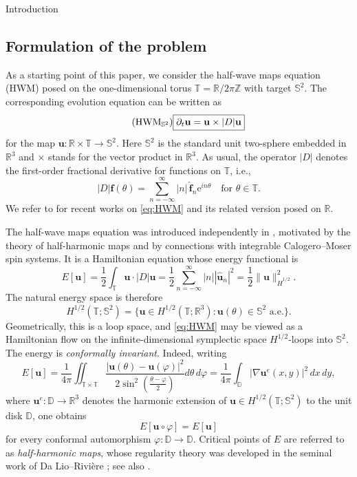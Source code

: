 \documentclass[10pt,reqno,a4paper]{amsart}
\makeatletter
\theoremstyle{definition}
\theoremstyle{remark}
\theoremstyle{remark}
\numberwithin{equation}{section}
\newcommand{\Z}{\mathbb{Z}}
\newcommand{\R}{\mathbb{R}}
\newcommand{\T}{\mathbb{T}}
\newcommand{\D}{\mathbb{D}}
\newcommand{\Ss}{\mathbb{S}}
\newcommand{\pt}{\partial}
\newcommand{\be}{\begin{equation}}
\newcommand{\ee}{\end{equation}}
\newcommand{\ii}{i}
\newcommand{\eu}{\mathrm{e}}
\newcommand{\uu}{\mathbf{u}}
\newcommand{\ff}{\mathbf{f}}
\renewcommand{\phi}{\varphi}
\def\section{\@startsection{section}{1}%
  \z@{1.5\linespacing\@plus\linespacing}{.5\linespacing}%
  {\normalfont\bfseries\large\centering}}
\makeatother
\begin{document}
\tableofcontents

\section{Introduction} \label{sec:intro}

\subsection{Formulation of the problem} As a starting point of this paper, we consider the half-wave maps equation (HWM) posed on the one-dimensional torus $\T = \R/2 \pi \Z$ with target $\Ss^2$. The corresponding evolution equation can be written as
\be \label{eq:HWM_S2} \tag{HWM$_{\Ss^2}$}
\boxed{\pt_t \uu = \uu \times |D| \uu}
\ee
for the map $\uu : \R \times \T \to \Ss^2$. Here $\Ss^2$ is the standard unit two-sphere embedded in $\R^3$ and $\times$ stands for the vector product in $\R^3$. As usual, the operator $|D|$ denotes the first-order fractional derivative for functions on $\T$, i.e., 
$$
|D| \ff(\theta) = \sum_{n =-\infty}^{\infty} |n| \, \widehat{\ff}_n \eu^{\ii n \theta} \quad \mbox{for $\theta \in \T$}.
$$ 
We refer to \cite{ZhSt-15, LeSc-18, Ma-22, BeKlLa-20, LeSo-24, GeLe-25} for recent works on \eqref{eq:HWM} and its related version posed on $\R$.  

\medskip
The half-wave maps equation was introduced independently in \cite{LeSc-18, ZhSt-15}, motivated by the theory of half-harmonic maps and by connections with integrable Calogero--Moser spin systems. It is a Hamiltonian equation whose energy functional is
$$
E[\uu]  = \frac{1}{2} \int_\T \uu \cdot |D| \uu = \frac{1}{2} \sum_{n=-\infty}^\infty |n| |\widehat{\uu}_n|^2 =  \frac{1}{2} \| \uu \|_{\dot{H}^{1/2}}^2.
$$
The natural energy space is therefore
$$
H^{1/2}(\T; \Ss^2) = \{ \uu \in H^{1/2}(\T; \R^3) : \mbox{$\uu(\theta) \in \Ss^2$  a.e.} \}.
$$
Geometrically, this is a loop space, and \eqref{eq:HWM} may be viewed as a Hamiltonian flow on the infinite-dimensional symplectic space $H^{1/2}$-loops into $\Ss^2$. The energy is  {\em conformally invariant}. Indeed, writing
$$
E[\uu] = \frac{1}{4 \pi} \iint_{\T \times \T} \frac{|\uu(\theta)-\uu(\phi)|^2}{2 \sin^2 (\frac{\theta-\phi}{2} ) } d \theta \, d \phi = \frac{1}{4 \pi} \int_{\D} |\nabla \uu^e(x,y)|^2 \, dx \,dy,
$$
where $\uu^e : \D \to \R^3$ denotes the harmonic extension of $\uu \in H^{1/2}(\T; \Ss^2)$ to the unit disk $\D$, one obtains 
$$
E[\uu \circ \phi] = E[\uu]
$$
for every conformal automorphism $\phi : \D \to \D$. Critical points of $E$ are referred to as {\em half-harmonic maps}, whose regularity theory was developed in the seminal work of Da Lio--Rivi\`ere \cite{LiRi-11}; see also \cite{MiSi-15,LeSc-18, MaSc-18}.
\end{document}
